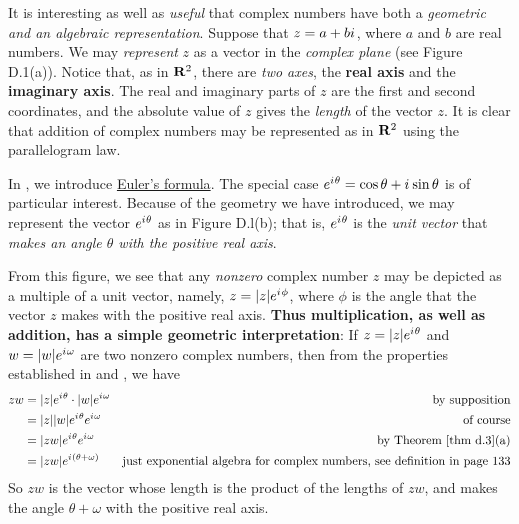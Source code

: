 \begin{remark} \label{remark d.6}
It is interesting as well as \emph{useful} that complex numbers have both a \emph{geometric and an algebraic representation}.
Suppose that \(z = a + b{i\mkern1mu}\), where \(a\) and \(b\) are real numbers.
We may \emph{represent} \(z\) as a vector in the \emph{complex plane} (see Figure D.1(a)).
Notice that, as in \(\mathbf{R}^2\), there are \emph{two axes}, the \textbf{real axis} and the \textbf{imaginary axis}.
The real and imaginary parts of \(z\) are the first and second coordinates, and the absolute value of \(z\) gives the \emph{length} of the vector \(z\).
It is clear that addition of complex numbers may be represented as in \(\mathbf{R}^2\) using the parallelogram law.
\end{remark}

\begin{remark} \label{remark d.7}
In , we introduce \href{https://www.wikiwand.com/en/Euler\%27s_formula}{Euler's formula}.
The special case \(e^{{i\mkern1mu} \theta} = \cos \theta + {i\mkern1mu} \sin \theta\) is of particular interest.
Because of the geometry we have introduced, we may represent the vector \(e^{{i\mkern1mu} \theta}\) as in Figure D.l(b);
that is, \(e^{{i\mkern1mu} \theta}\) is the \emph{unit vector} that \emph{makes an angle \(\theta\) with the positive real axis}.

From this figure, we see that any \emph{nonzero} complex number \(z\) may be depicted as a multiple of a unit vector, namely, \(z = \lvert z\rvert e^{{i\mkern1mu} \phi}\), where \(\phi\) is the angle that the vector \(z\) makes with the positive real axis.
\textbf{Thus multiplication, as well as addition, has a simple geometric interpretation}:
If \(z = \lvert z\rvert e^{{i\mkern1mu} \theta}\) and \(w = \lvert w\rvert e^{{i\mkern1mu} \omega}\) are two nonzero complex numbers, then from the properties established in
 and , we have
\begin{align*}
    zw & = \abs{z} e^{\iu \theta} \cdot \abs{w} e^{\iu \omega} & \text{by supposition} \\
       & = \abs{z}\abs{w} e^{\iu \theta} e^{\iu \omega} & \text{of course} \\
       & = \abs{zw} e^{\iu \theta} e^{\iu \omega} & \text{by \THM{d.3}(a)} \\
       & = \abs{zw} e^{\iu (\theta + \omega)} & \text{just exponential algebra for complex numbers, see definition in page 133}
\end{align*}
So \(zw\) is the vector whose length is the product of the lengths of \(zw\), and makes the angle \(\theta + \omega\) with the positive real axis.
\end{remark}

